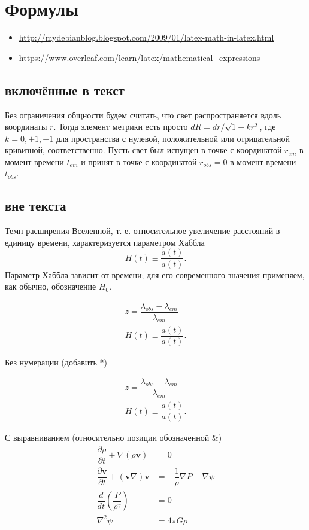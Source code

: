 \chapter{Формулы}\label{ch:eq}
\begin{itemize}
	\item \href{http://mydebianblog.blogspot.com/2009/01/latex-math-in-latex.html}{http://mydebianblog.blogspot.com/2009/01/latex-math-in-latex.html}
\item 	\href{https://www.overleaf.com/learn/latex/mathematical_expressions}{https://www.overleaf.com/learn/latex/mathematical\_expressions}
\end{itemize}

\section{включённые в текст}
Без ограничения общности будем считать, что свет распространяется вдоль координаты $r$. Тогда элемент метрики есть просто $dR = dr/\sqrt{1 - kr^2}$, где $k = 0, +1, -1$ для пространства с нулевой, положительной или отрицательной кривизной, соответственно. Пусть свет был испущен в точке с координатой $r_{em}$ в момент времени $t_{em}$ и принят в точке с координатой $r_{obs} = 0$ в момент времени $t_{obs}$.
\section{вне текста}
Темп  расширения  Вселенной,  т. е.  относительное  увеличение  расстояний  в  единицу  времени,  характеризуется  параметром  Хаббла $$H(t)\equiv\dfrac{\dot{a}(t)}{a(t)}.$$ Параметр  Хаббла  зависит  от  времени;  для  его  современного  значения  применяем, как  обычно,  обозначение  $H_0$.

\begin{gather}\label{f1}
	z=\dfrac{\lambda_{obs}-\lambda_{em}}{\lambda_{em}}\\
	H(t)\equiv\dfrac{\dot{a}(t)}{a(t)}.
\end{gather}

Без нумерации (добавить *)

\begin{gather*}\label{f2}
	z=\dfrac{\lambda_{obs}-\lambda_{em}}{\lambda_{em}}\\
	H(t)\equiv\dfrac{\dot{a}(t)}{a(t)}.
\end{gather*}


С выравниванием (относительно позиции обозначенной \&)
\begin{align}\label{f3}
	\dfrac{\partial\rho}{\partial t}+\nabla(\rho\mathbf{v})&= 0\\
	\dfrac{\partial\mathbf{v}}{\partial t}+(\mathbf{v}\nabla)\mathbf{v}&=-\dfrac{1}{\rho}\nabla P-\nabla\psi\\
	\dfrac{d}{dt}\left(\dfrac{P}{\rho^\gamma}\right)&=0\\
	\nabla^2\psi&=4\pi G\rho
\end{align}

